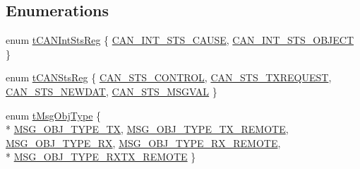 \subsection*{Enumerations}
\begin{DoxyCompactItemize}
\item 
enum \hyperlink{group__can__api_ga73584383f566e98bf822b371a03becfc}{t\+C\+A\+N\+Int\+Sts\+Reg} \{ \hyperlink{group__can__api_gga73584383f566e98bf822b371a03becfcaaab739e796c1216de72acf16410795a5}{C\+A\+N\+\_\+\+I\+N\+T\+\_\+\+S\+T\+S\+\_\+\+C\+A\+U\+SE}, 
\hyperlink{group__can__api_gga73584383f566e98bf822b371a03becfca8cb85391f55d762fcff16bb285903304}{C\+A\+N\+\_\+\+I\+N\+T\+\_\+\+S\+T\+S\+\_\+\+O\+B\+J\+E\+CT}
 \}
\item 
enum \hyperlink{group__can__api_gad898b7c10eb4d9282bd4c25fc935b3d2}{t\+C\+A\+N\+Sts\+Reg} \{ \hyperlink{group__can__api_ggad898b7c10eb4d9282bd4c25fc935b3d2aac2ece80a767774a99d1fb1e463aa932}{C\+A\+N\+\_\+\+S\+T\+S\+\_\+\+C\+O\+N\+T\+R\+OL}, 
\hyperlink{group__can__api_ggad898b7c10eb4d9282bd4c25fc935b3d2afffa0c96b01a03aff5a5dd32c5aa77c7}{C\+A\+N\+\_\+\+S\+T\+S\+\_\+\+T\+X\+R\+E\+Q\+U\+E\+ST}, 
\hyperlink{group__can__api_ggad898b7c10eb4d9282bd4c25fc935b3d2afa63f81ede60a5209bc32c6eb94e7512}{C\+A\+N\+\_\+\+S\+T\+S\+\_\+\+N\+E\+W\+D\+AT}, 
\hyperlink{group__can__api_ggad898b7c10eb4d9282bd4c25fc935b3d2a3fe016f4c8154bf2ef524621edfb293d}{C\+A\+N\+\_\+\+S\+T\+S\+\_\+\+M\+S\+G\+V\+AL}
 \}
\item 
enum \hyperlink{group__can__api_gad3fa840d5e84a9366ba2a8c958c069a2}{t\+Msg\+Obj\+Type} \{ \\*
\hyperlink{group__can__api_ggad3fa840d5e84a9366ba2a8c958c069a2aa13483d5640bff99d693d271c2238230}{M\+S\+G\+\_\+\+O\+B\+J\+\_\+\+T\+Y\+P\+E\+\_\+\+TX}, 
\hyperlink{group__can__api_ggad3fa840d5e84a9366ba2a8c958c069a2a01289338e40c4573d4a78e6d40cab433}{M\+S\+G\+\_\+\+O\+B\+J\+\_\+\+T\+Y\+P\+E\+\_\+\+T\+X\+\_\+\+R\+E\+M\+O\+TE}, 
\hyperlink{group__can__api_ggad3fa840d5e84a9366ba2a8c958c069a2a19480934236e65a7090acd45caecb0a3}{M\+S\+G\+\_\+\+O\+B\+J\+\_\+\+T\+Y\+P\+E\+\_\+\+RX}, 
\hyperlink{group__can__api_ggad3fa840d5e84a9366ba2a8c958c069a2ae268696d7605c98094e4136eb646a251}{M\+S\+G\+\_\+\+O\+B\+J\+\_\+\+T\+Y\+P\+E\+\_\+\+R\+X\+\_\+\+R\+E\+M\+O\+TE}, 
\\*
\hyperlink{group__can__api_ggad3fa840d5e84a9366ba2a8c958c069a2a8aed86e235facdf4ab0ce8cb53de65c1}{M\+S\+G\+\_\+\+O\+B\+J\+\_\+\+T\+Y\+P\+E\+\_\+\+R\+X\+T\+X\+\_\+\+R\+E\+M\+O\+TE}
 \}
\end{DoxyCompactItemize}
